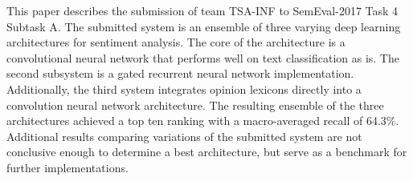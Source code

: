 This paper describes the submission of team TSA-INF to SemEval-2017 Task 4 Subtask A. The submitted system is an ensemble of three varying deep learning architectures for sentiment analysis. The core of the architecture is a convolutional neural network that performs well on text classification as is. The second subsystem is a gated recurrent neural network implementation. Additionally, the third system integrates opinion lexicons directly into a convolution neural network architecture. The resulting ensemble of the three architectures achieved a top ten ranking with a macro-averaged recall of 64.3\%. Additional results comparing variations of the submitted system are not conclusive enough to determine a best architecture, but serve as a benchmark for further implementations.
